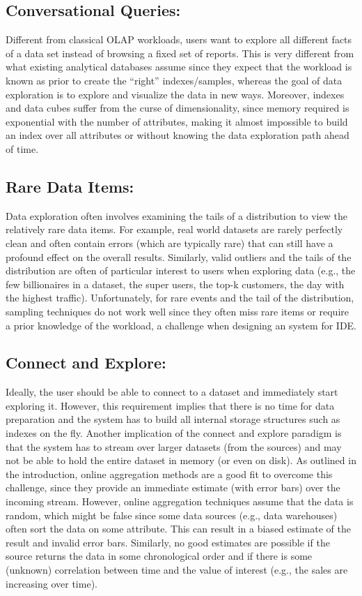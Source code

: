 \documentclass[12pt,letterpaper, onecolumn]{exam}
\begin{document}
    \subsection{Conversational Queries: }
    Different from classical OLAP workloads, users want to explore all different facts of a data set instead of browsing a fixed set of reports. This is very different from what existing analytical databases assume since they expect that the workload is known as prior to create the “right” indexes/samples, whereas the goal of data exploration is to explore and visualize the data in new ways. Moreover, indexes and data cubes suffer from the curse of dimensionality, since memory required is exponential with the number of attributes, making it almost impossible to build an index over all attributes or without knowing the data exploration path ahead of time.
    
    \subsection{Rare Data Items:}
    Data exploration often involves examining the tails of a distribution to view the relatively rare data items. For example, real world datasets are rarely perfectly clean and often contain errors (which are typically rare) that can still have a profound effect on the overall results. Similarly, valid outliers and the tails of the distribution are often of particular interest to users when exploring data (e.g., the few billionaires in a dataset, the super users, the top-k customers, the day with the highest traffic). Unfortunately, for rare events and the tail of the distribution, sampling techniques do not work well since they often miss rare items or require a prior knowledge of the workload, a challenge when designing an system for IDE.
    
    \subsection{Connect and Explore:}
    Ideally, the user should be able to connect to a dataset and immediately start exploring it. However, this requirement implies that there is no time for data preparation and the system has to build all internal storage structures such as indexes on the fly. Another implication of the connect and explore paradigm is that the system has to stream over larger datasets (from the sources) and may not be able to hold the entire dataset in memory (or even on disk). As outlined in the introduction, online aggregation methods are a good fit to overcome this challenge, since they provide an immediate estimate (with error bars) over the incoming stream. However, online aggregation techniques assume that the data is random, which might be false since some data sources (e.g., data warehouses) often sort the data on some attribute. This can result in a biased estimate of the result and invalid error bars. Similarly, no good estimates are possible if the source returns the data in some chronological order and if there is some (unknown) correlation between time and the value of interest (e.g., the sales are increasing over time).
    
\end{document}
